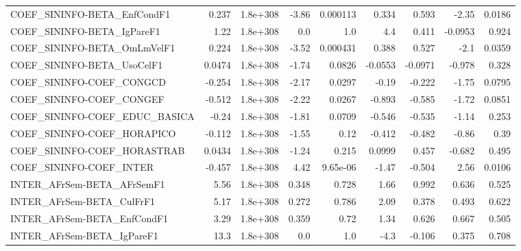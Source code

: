 \begin{tabular}{lrrrrrrrr}
COEF\_SININFO-BETA\_EnfCondF1           &       0.237 &     1.8e+308 &    -3.86 & 0.000113 &      0.334 &       0.593 &        -2.35 &        0.0186 \\
COEF\_SININFO-BETA\_IgPareF1            &        1.22 &     1.8e+308 &      0.0 &      1.0 &        4.4 &       0.411 &      -0.0953 &         0.924 \\
COEF\_SININFO-BETA\_OmLmVelF1           &       0.224 &     1.8e+308 &    -3.52 & 0.000431 &      0.388 &       0.527 &         -2.1 &        0.0359 \\
COEF\_SININFO-BETA\_UsoCelF1            &      0.0474 &     1.8e+308 &    -1.74 &   0.0826 &    -0.0553 &     -0.0971 &       -0.978 &         0.328 \\
COEF\_SININFO-COEF\_CONGCD              &      -0.254 &     1.8e+308 &    -2.17 &   0.0297 &      -0.19 &      -0.222 &        -1.75 &        0.0795 \\
COEF\_SININFO-COEF\_CONGEF              &      -0.512 &     1.8e+308 &    -2.22 &   0.0267 &     -0.893 &      -0.585 &        -1.72 &        0.0851 \\
COEF\_SININFO-COEF\_EDUC\_BASICA         &       -0.24 &     1.8e+308 &    -1.81 &   0.0709 &     -0.546 &      -0.535 &        -1.14 &         0.253 \\
COEF\_SININFO-COEF\_HORAPICO            &      -0.112 &     1.8e+308 &    -1.55 &     0.12 &     -0.412 &      -0.482 &        -0.86 &          0.39 \\
COEF\_SININFO-COEF\_HORASTRAB           &      0.0434 &     1.8e+308 &    -1.24 &    0.215 &     0.0999 &       0.457 &       -0.682 &         0.495 \\
COEF\_SININFO-COEF\_INTER               &      -0.457 &     1.8e+308 &     4.42 & 9.65e-06 &      -1.47 &      -0.504 &         2.56 &        0.0106 \\
INTER\_AFrSem-BETA\_AFrSemF1            &        5.56 &     1.8e+308 &    0.348 &    0.728 &       1.66 &       0.992 &        0.636 &         0.525 \\
INTER\_AFrSem-BETA\_CulFrF1             &        5.17 &     1.8e+308 &    0.272 &    0.786 &       2.09 &       0.378 &        0.493 &         0.622 \\
INTER\_AFrSem-BETA\_EnfCondF1           &        3.29 &     1.8e+308 &    0.359 &     0.72 &       1.34 &       0.626 &        0.667 &         0.505 \\
INTER\_AFrSem-BETA\_IgPareF1            &        13.3 &     1.8e+308 &      0.0 &      1.0 &       -4.3 &      -0.106 &        0.375 &         0.708 \\

\end{tabular}
